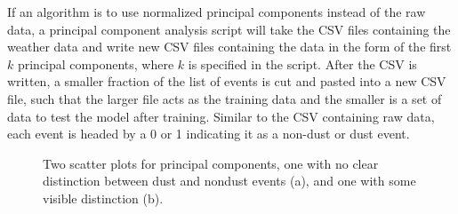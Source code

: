 \documentclass{article}
\begin{document}
If an algorithm is to use normalized principal components instead of the raw data, a principal component analysis script will take the CSV files containing the weather data and write new CSV files containing the data in the form of the first $k$ principal components, where $k$ is specified in the script. After the CSV is written, a smaller fraction of the list of events is cut and pasted into a new CSV file, such that the larger file acts as the training data and the smaller is a set of data to test the model after training. Similar to the CSV containing raw data, each event is headed by a 0 or 1 indicating it as a non-dust or dust event.
\begin{figure}[H]
	\label{fig:pca}
	\caption{Two scatter plots for principal components, one with no clear distinction between dust and nondust events (a), and one with some visible distinction (b).}
\end{figure}
\pagebreak
\end{document}
